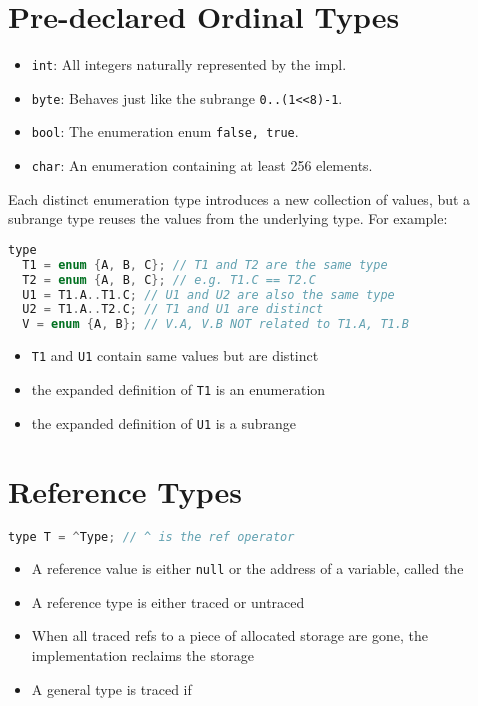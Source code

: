 \documentclass[10pt,a4paper,landscape]{article}
\begin{document}
\begin{multicols*}{3}
\section*{Pre-declared Ordinal Types }
\begin{itemize}
\item \texttt{int}: All integers naturally represented by the impl.
\item \texttt{byte}: Behaves just like the subrange \texttt{0..(1<<8)-1}.
\item \texttt{bool}: The enumeration enum \texttt{{false, true}}.
\item \texttt{char}: An enumeration containing at least 256 elements.
\end{itemize}
Each distinct enumeration type introduces a new collection of values, but a subrange type reuses the values from the underlying type. For example:
\begin{lstlisting}[language=c]
type
  T1 = enum {A, B, C}; // T1 and T2 are the same type
  T2 = enum {A, B, C}; // e.g. T1.C == T2.C
  U1 = T1.A..T1.C; // U1 and U2 are also the same type
  U2 = T1.A..T2.C; // T1 and U1 are distinct
  V = enum {A, B}; // V.A, V.B NOT related to T1.A, T1.B
\end{lstlisting}
\begin{itemize}
\item \texttt{T1} and \texttt{U1} contain same values but are distinct
\item the expanded definition of \texttt{T1} is an enumeration
\item the expanded definition of \texttt{U1} is a subrange
\end{itemize}
\section*{Reference Types}
\begin{lstlisting}[language=c]
type T = ^Type; // ^ is the ref operator
\end{lstlisting}
\begin{itemize}
\item A reference value is either \texttt{null} or the address of a variable, called the 
\item A reference type is either traced or untraced
\item When all traced refs to a piece of allocated storage are gone, the implementation reclaims the storage
\item A general type is traced if
\end{itemize}

\end{multicols*}
\end{document}

